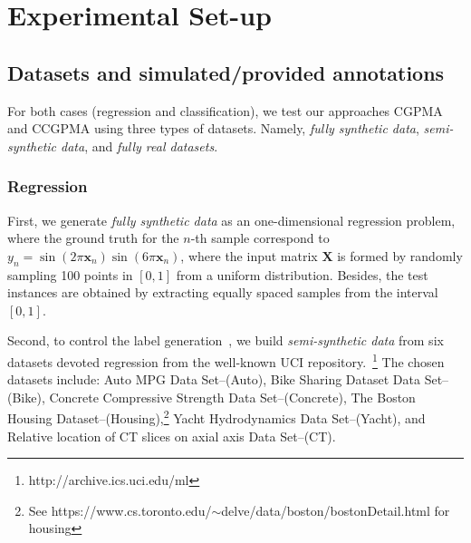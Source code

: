 \documentclass[journal]{IEEEtran}
\providecommand{\ve}[1]{{\bm{#1}}}%
\providecommand{\ve}[1]{{\mathbf{#1}}}
\newcommand{\boldx}{\mathbf{x}}
\newcommand{\boldX}{\mathbf{X}} %
\begin{document}








\section{Experimental Set-up}\label{sec:expsetup}
\subsection{Datasets and simulated/provided annotations}\label{sec:datasets}
For both cases (regression and classification), we test our approaches CGPMA and CCGPMA using three types of datasets. Namely, \textit{fully synthetic data}, \textit{semi-synthetic data}, and \textit{fully real datasets}. 

\subsubsection{Regression}\label{sec:datasetsReg}
First, we generate \textit{fully synthetic data} as an one-dimensional regression problem, where the ground truth for the $n$-th sample correspond to $y_n = \sin(2\pi \boldx_n)\sin(6\pi \boldx_n)$, where the input matrix $\boldX$ is formed by randomly sampling 100 points in $[0,1]$ from a uniform distribution. Besides, the test instances are obtained by extracting equally spaced samples from the interval $[0,1]$.

Second, to control the label generation~\cite{ruiz2019learning}, we build \textit{semi-synthetic data} from six datasets devoted regression from the well-known {UCI repository}.~\footnote{http://archive.ics.uci.edu/ml}
The chosen datasets include: {Auto MPG Data Set}--(Auto), {Bike Sharing Dataset Data Set}--(Bike), {Concrete Compressive Strength Data Set}--(Concrete), {The Boston Housing Dataset}--(Housing),\footnote{See https://www.cs.toronto.edu/$\sim${d}elve/data/boston/bostonDetail.html for housing} {Yacht Hydrodynamics Data Set}--(Yacht), and {Relative location of CT slices on axial axis Data Set}--(CT).  
\end{document}
